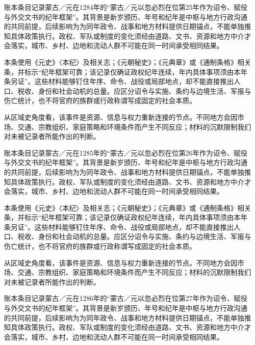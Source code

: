 账本条目记录蒙古／元在1284年的“蒙古／元以忽必烈在位第25年作为诏令、赋役与外交文书的纪年框架”。其背景是新岁颁历、年号和纪年是中枢与地方行政沟通的共同前提，后续影响为为同年政令、战事和地方材料提供日期锚点，不能单独推知具体政策执行。政权、军队或制度的变化须经由道路、文书、资源和地方中介才会落实，城市、乡村、边地和流动人群不可能在同一时间承受相同结果。

本条使用《元史》〈本纪〉及相关志；《元朝秘史》；《元典章》或《通制条格》相关条，并标示“纪年框架可靠；该记录仅确证政权纪年连续，年内具体事项须由本年条另证”。这些材料能够钉住年序、命令、战役或局部地点，却不能直接推出人口、税收、身份和社会动机的总量。应区分诏令与实施、条约与边境生活、军报与伤亡统计，也不将官府的族群或行政称谓写成固定的社会本质。

从区域史角度看，该事件是资源、信息与权力重新连接的节点。不同地方会因市场、交通、宗教组织、家庭策略和环境条件而产生不同反应；材料的沉默限制我们对未被记录者所能作出的判断。

账本条目记录蒙古／元在1285年的“蒙古／元以忽必烈在位第26年作为诏令、赋役与外交文书的纪年框架”。其背景是新岁颁历、年号和纪年是中枢与地方行政沟通的共同前提，后续影响为为同年政令、战事和地方材料提供日期锚点，不能单独推知具体政策执行。政权、军队或制度的变化须经由道路、文书、资源和地方中介才会落实，城市、乡村、边地和流动人群不可能在同一时间承受相同结果。

本条使用《元史》〈本纪〉及相关志；《元朝秘史》；《元典章》或《通制条格》相关条，并标示“纪年框架可靠；该记录仅确证政权纪年连续，年内具体事项须由本年条另证”。这些材料能够钉住年序、命令、战役或局部地点，却不能直接推出人口、税收、身份和社会动机的总量。应区分诏令与实施、条约与边境生活、军报与伤亡统计，也不将官府的族群或行政称谓写成固定的社会本质。

从区域史角度看，该事件是资源、信息与权力重新连接的节点。不同地方会因市场、交通、宗教组织、家庭策略和环境条件而产生不同反应；材料的沉默限制我们对未被记录者所能作出的判断。

账本条目记录蒙古／元在1286年的“蒙古／元以忽必烈在位第27年作为诏令、赋役与外交文书的纪年框架”。其背景是新岁颁历、年号和纪年是中枢与地方行政沟通的共同前提，后续影响为为同年政令、战事和地方材料提供日期锚点，不能单独推知具体政策执行。政权、军队或制度的变化须经由道路、文书、资源和地方中介才会落实，城市、乡村、边地和流动人群不可能在同一时间承受相同结果。

